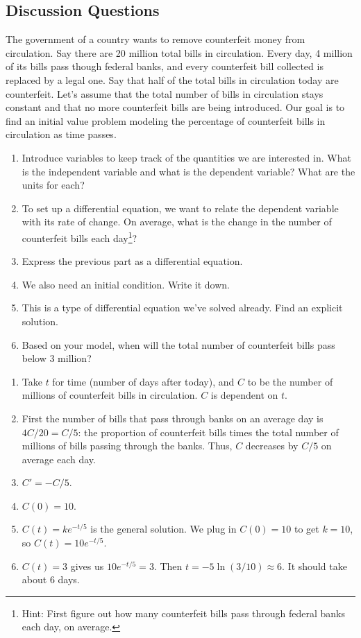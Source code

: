 \documentclass[12pt]{amsart}
\numberwithin{equation}{section}
\theoremstyle{plain} %
\theoremstyle{definition}
\theoremstyle{remark}
\begin{document}
\subsection*{Discussion Questions}

The government of a country wants to remove counterfeit money from circulation. Say there are 20 million total bills in circulation. Every day, 4 million of its bills pass though federal banks, and every counterfeit bill collected is replaced by a legal one. Say that half of the total bills in circulation today are counterfeit. Let's assume that the total number of bills in circulation stays constant and that no more counterfeit bills are being introduced. Our goal is to find an initial value problem modeling the percentage of counterfeit bills in circulation as time passes. 

\begin{enumerate}
\item Introduce variables to keep track of the quantities we are interested in. What is the independent variable and what is the dependent variable? What are the units for each?
\item To set up a differential equation, we want to relate the dependent variable with its rate of change. On average, what is the change in the number of counterfeit bills each day\footnote{Hint: First figure out how many counterfeit bills pass through federal banks each day, on average.}?
\item Express the previous part as a differential equation.
\item We also need an initial condition. Write it down.
\item This is a type of differential equation we've solved already. Find an explicit solution.
\item Based on your model, when will the total number of counterfeit bills pass below 3 million?
\end{enumerate}
\begin{framed}
\begin{enumerate}
\item Take $t$ for time (number of days after today), and $C$ to be the number of millions of counterfeit bills in circulation. $C$ is dependent on $t$.
\item First the number of bills that pass through banks on an average day is $4C/20 = C/5$: the proportion of counterfeit bills times the total number of millions of bills passing through the banks. Thus, $C$ decreases by $C/5$ on average each day.
\item $C'=-C/5$.
\item $C(0)=10$.
\item $C(t)=ke^{-t/5}$ is the general solution. We plug in $C(0)=10$ to get $k=10$, so $C(t)=10 e^{-t/5}$.
\item $C(t)=3$ gives us $10e^{-t/5}=3$. Then $t=-5 \ln(3/10) \approx 6$. It should take about $6$ days.
\end{enumerate}
\end{framed}
\end{document}

